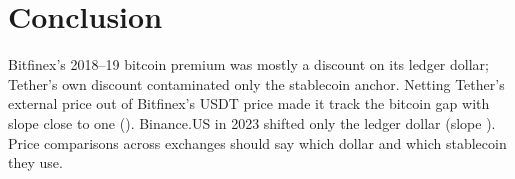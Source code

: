 \documentclass[preprint,10pt]{elsarticle}
\begin{document}
\section{Conclusion}
Bitfinex's 2018--19 bitcoin premium was mostly a discount on its ledger dollar; Tether's own discount contaminated only the stablecoin anchor. Netting Tether's external price out of Bitfinex's USDT price made it track the bitcoin gap with slope close to one (\NumKStressDaySlopeAdj{}). Binance.US in 2023 shifted only the ledger dollar (slope \NumUAnchorBnusSlope{}). Price comparisons across exchanges should say which dollar and which stablecoin they use.



\end{document}
